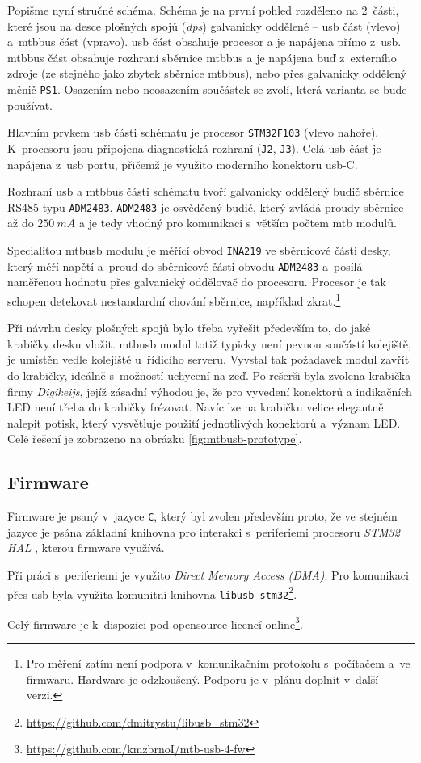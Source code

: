 Popišme nyní stručné schéma. Schéma je na první pohled rozděleno na 2~části,
které jsou na desce plošných spojů (\textit{\gls{dps}}) galvanicky oddělené –
\gls{usb} část (vlevo) a~\gls{mtbbus} část (vpravo). \gls{usb} část obsahuje
procesor a je napájena přímo z~\gls{usb}. \gls{mtbbus} část obsahuje rozhraní
sběrnice \gls{mtbbus} a je napájena buď z~externího zdroje (ze stejného jako
zbytek sběrnice \gls{mtbbus}), nebo přes galvanicky oddělený měnič \texttt{PS1}.
Osazením nebo neosazením součástek se zvolí, která varianta se bude používat.

Hlavním prvkem \gls{usb} části schématu je procesor
\texttt{STM32F103} (vlevo nahoře). K~procesoru jsou připojena diagnostická
rozhraní (\texttt{J2}, \texttt{J3}). Celá \gls{usb} část je napájena z~\gls{usb}
portu, přičemž je využito moderního konektoru \gls{usb}-C.

Rozhraní \gls{usb} a \gls{mtbbus} části schématu tvoří galvanicky oddělený
budič sběrnice RS485 typu \texttt{ADM2483}. \texttt{ADM2483} je osvědčený budič,
který zvládá proudy sběrnice až do $250~mA$ \cite{adm2483-datasheet} a je tedy
vhodný pro komunikaci s~větším počtem \gls{mtb} modulů.

Specialitou \gls{mtbusb} modulu je měřící obvod \texttt{INA219} ve sběrnicové
části desky, který měří napětí a~proud do sběrnicové části obvodu
\texttt{ADM2483} a~posílá naměřenou hodnotu přes galvanický oddělovač do
procesoru. Procesor je tak schopen detekovat nestandardní chování sběrnice,
například zkrat.\footnote{Pro měření zatím není podpora v~komunikačním
protokolu s~počítačem a~ve firmwaru. Hardware je odzkoušený. Podporu je v~plánu
doplnit v~další verzi.}

Při návrhu desky plošných spojů bylo třeba vyřešit především to, do jaké
krabičky desku vložit. \gls{mtbusb} modul totiž typicky není pevnou součástí
kolejiště, je umístěn vedle kolejiště u~řídicího serveru. Vyvstal tak požadavek
modul zavřít do krabičky, ideálně s~možností uchycení na zeď. Po rešerši byla
zvolena krabička firmy \textit{Digikeijs}, jejíž zásadní výhodou je, že pro
vyvedení konektorů a indikačních LED není třeba do krabičky frézovat. Navíc lze
na krabičku velice elegantně nalepit potisk, který vysvětluje použití
jednotlivých konektorů a~význam LED. Celé řešení je zobrazeno na
obrázku \ref{fig:mtbusb-prototype}.


\subsection{Firmware}

Firmware je psaný v~jazyce \texttt{C}, který byl zvolen především proto, že ve
stejném jazyce je psána základní knihovna pro interakci s~periferiemi procesoru
\textit{STM32 HAL} \cite{stm32-hal}, kterou firmware využívá.

Při práci s~periferiemi je využito \textit{Direct Memory Access (DMA)}. Pro
komunikaci přes \gls{usb} byla využita komunitní knihovna
\texttt{libusb\_stm32}\footnote{\url{https://github.com/dmitrystu/libusb_stm32}}.

Celý firmware je k~dispozici pod opensource licencí
online\footnote{\url{https://github.com/kmzbrnoI/mtb-usb-4-fw}}.
